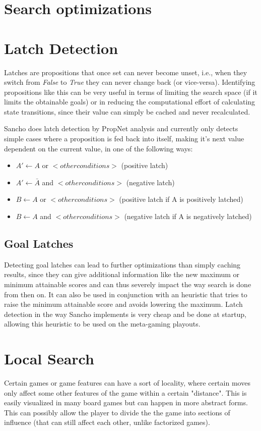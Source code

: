 \section{Search optimizations}

\section{Latch Detection}
Latches are propositions that once set can never become unset, i.e., when they switch from \textit{False} to \textit{True} they can never change back (or vice-versa). Identifying propositions like this can be very useful in terms of limiting the search space (if it limits the obtainable goals) or in reducing the computational effort of calculating state transitions, since their value can simply be cached and never recalculated.

Sancho does latch detection by PropNet analysis and currently only detects simple cases where a proposition is fed back into itself, making it's next value dependent on the current value, in one of the following ways:

\begin{itemize}
	\item $A' \leftarrow A$ or $<other conditions>$ (positive latch)
	\item $A' \leftarrow \bar A$ and $<other conditions>$ (negative latch)
	\item $B \leftarrow A$ or $<other conditions>$ (positive latch if A is positively latched)
	\item $B \leftarrow A$ and $<other conditions>$ (negative latch if A is negatively latched)
\end{itemize}


\subsection{Goal Latches}
Detecting goal latches can lead to further optimizations than simply caching results, since they can give additional information like the new maximum or minimum attainable scores and can thus severely impact the way search is done from then on. It can also be used in conjunction with an heuristic that tries to raise the minimum attainable score and avoids lowering the maximum.
Latch detection in the way Sancho implements is very cheap and be done at startup, allowing this heuristic to be used on the meta-gaming playouts.

\iffalse
\section{Local Search}
Certain games or game features can have a sort of locality, where certain moves only affect some other features of the game within a certain "distance". This is easily visualized in many board games but can happen in more abstract forms. This can possibly allow the player to divide the the game into sections of influence (that can still affect each other, unlike factorized games).

